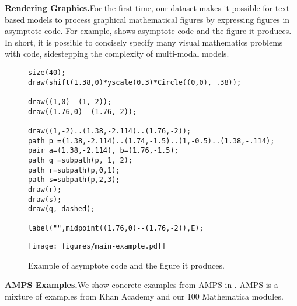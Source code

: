 \documentclass{article}
\begin{document}
\noindent\textbf{Rendering Graphics.}\quad For the first time, our dataset makes it possible for text-based models to process graphical mathematical figures by expressing figures in asymptote code. For example,  shows asymptote code and the figure it produces. In short, it is possible to concisely specify many visual mathematics problems with code, sidestepping the complexity of multi-modal models. 

\begin{figure*}
    \centering
    \begin{verbatim}
size(40);
draw(shift(1.38,0)*yscale(0.3)*Circle((0,0), .38));

draw((1,0)--(1,-2));
draw((1.76,0)--(1.76,-2));

draw((1,-2)..(1.38,-2.114)..(1.76,-2));
path p =(1.38,-2.114)..(1.74,-1.5)..(1,-0.5)..(1.38,-.114);
pair a=(1.38,-2.114), b=(1.76,-1.5);
path q =subpath(p, 1, 2);
path r=subpath(p,0,1);
path s=subpath(p,2,3);
draw(r);
draw(s);
draw(q, dashed);

label("",midpoint((1.76,0)--(1.76,-2)),E);
    \end{verbatim}
\texttt{[image: figures/main-example.pdf]}
    
    
    
\caption{Example of asymptote code and the figure it produces.}
    \label{fig:asy}
\end{figure*}


\noindent\textbf{AMPS Examples.}\quad We show concrete examples from AMPS in . AMPS is a mixture of examples from Khan Academy and our 100 Mathematica modules.
\end{document}
